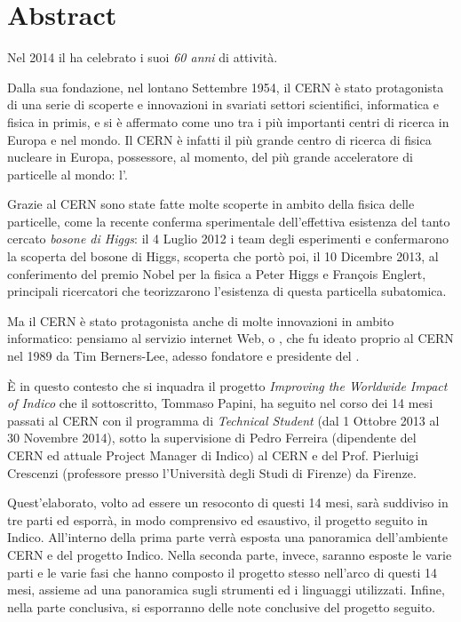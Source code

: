 \cleardoublepage
{}
\chapter*{Abstract}

	Nel 2014 il  ha celebrato i suoi \textit{60 anni} di attività.
	
	Dalla sua fondazione, nel lontano Settembre 1954, il \ac{CERN} è stato protagonista di una serie di scoperte e innovazioni in svariati settori scientifici, informatica e fisica in primis, e si è affermato come uno tra i più importanti centri di ricerca in Europa e nel mondo. Il \ac{CERN} è infatti il più grande centro di ricerca di fisica nucleare in Europa, possessore, al momento, del più grande acceleratore di particelle al mondo: l'.
	
	Grazie al \ac{CERN} sono state fatte molte scoperte in ambito della fisica delle particelle, come la recente conferma sperimentale dell'effettiva esistenza del tanto cercato \textit{bosone di Higgs}: il 4 Luglio 2012 i team degli esperimenti  e  confermarono la scoperta del bosone di Higgs, scoperta che portò poi, il 10 Dicembre 2013, al conferimento del premio Nobel per la fisica a Peter Higgs e François Englert, principali ricercatori che teorizzarono l'esistenza di questa particella subatomica.
	
	Ma il \ac{CERN} è stato protagonista anche di molte innovazioni in ambito informatico: pensiamo al servizio internet Web, o , che fu ideato proprio al \ac{CERN} nel 1989 da Tim Berners-Lee, adesso fondatore e presidente del .
	
	È in questo contesto che si inquadra il progetto \textit{Improving the Worldwide Impact of Indico} che il sottoscritto, Tommaso Papini, ha seguito nel corso dei 14 mesi passati al \ac{CERN} con il programma di \textit{Technical Student} (dal 1 Ottobre 2013 al 30 Novembre 2014), sotto la supervisione di Pedro Ferreira (dipendente del \ac{CERN} ed attuale Project Manager di Indico) al \ac{CERN} e del Prof. Pierluigi Crescenzi (professore presso l'Università degli Studi di Firenze) da Firenze.
	
	Quest'elaborato, volto ad essere un resoconto di questi 14 mesi, sarà suddiviso in tre parti ed esporrà, in modo comprensivo ed esaustivo, il progetto seguito in Indico. All'interno della prima parte verrà esposta una panoramica dell'ambiente \ac{CERN} e del progetto Indico. Nella seconda parte, invece, saranno esposte le varie parti e le varie fasi che hanno composto il progetto stesso nell'arco di questi 14 mesi, assieme ad una panoramica sugli strumenti ed i linguaggi utilizzati. Infine, nella parte conclusiva, si esporranno delle note conclusive del progetto seguito.
	